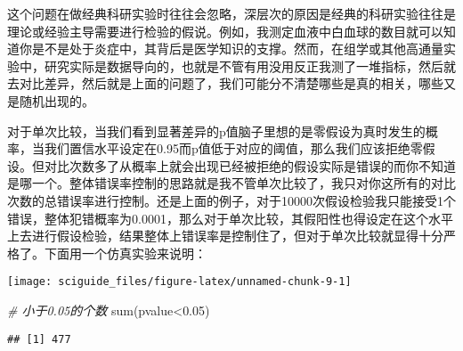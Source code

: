 \documentclass[]{tufte-book}
\newenvironment{Shaded}{}{}
\newcommand{\CommentTok}[1]{\textcolor[rgb]{0.38,0.63,0.69}{\textit{#1}}}
\newcommand{\ConstantTok}[1]{\textcolor[rgb]{0.53,0.00,0.00}{#1}}
\newcommand{\ControlFlowTok}[1]{\textcolor[rgb]{0.00,0.44,0.13}{\textbf{#1}}}
\newcommand{\DecValTok}[1]{\textcolor[rgb]{0.25,0.63,0.44}{#1}}
\newcommand{\FloatTok}[1]{\textcolor[rgb]{0.25,0.63,0.44}{#1}}
\newcommand{\FunctionTok}[1]{\textcolor[rgb]{0.02,0.16,0.49}{#1}}
\newcommand{\NormalTok}[1]{#1}
\newcommand{\OtherTok}[1]{\textcolor[rgb]{0.00,0.44,0.13}{#1}}
\newcommand{\SpecialCharTok}[1]{\textcolor[rgb]{0.25,0.44,0.63}{#1}}
\begin{document}
这个问题在做经典科研实验时往往会忽略，深层次的原因是经典的科研实验往往是理论或经验主导需要进行检验的假说。例如，我测定血液中白血球的数目就可以知道你是不是处于炎症中，其背后是医学知识的支撑。然而，在组学或其他高通量实验中，研究实际是数据导向的，也就是不管有用没用反正我测了一堆指标，然后就去对比差异，然后就是上面的问题了，我们可能分不清楚哪些是真的相关，哪些又是随机出现的。

对于单次比较，当我们看到显著差异的p值脑子里想的是零假设为真时发生的概率，当我们置信水平设定在0.95而p值低于对应的阈值，那么我们应该拒绝零假设。但对比次数多了从概率上就会出现已经被拒绝的假设实际是错误的而你不知道是哪一个。整体错误率控制的思路就是我不管单次比较了，我只对你这所有的对比次数的总错误率进行控制。还是上面的例子，对于10000次假设检验我只能接受1个错误，整体犯错概率为0.0001，那么对于单次比较，其假阳性也得设定在这个水平上去进行假设检验，结果整体上错误率是控制住了，但对于单次比较就显得十分严格了。下面用一个仿真实验来说明：

\begin{Shaded}
\end{Shaded}

\texttt{[image: sciguide\_files/figure-latex/unnamed-chunk-9-1]}

\begin{Shaded}
\begin{Highlighting}[]
\CommentTok{\# 小于0.05的个数}
\FunctionTok{sum}\NormalTok{(pvalue}\SpecialCharTok{\textless{}}\FloatTok{0.05}\NormalTok{)}
\end{Highlighting}
\end{Shaded}

\begin{verbatim}
## [1] 477
\end{verbatim}
\end{document}
